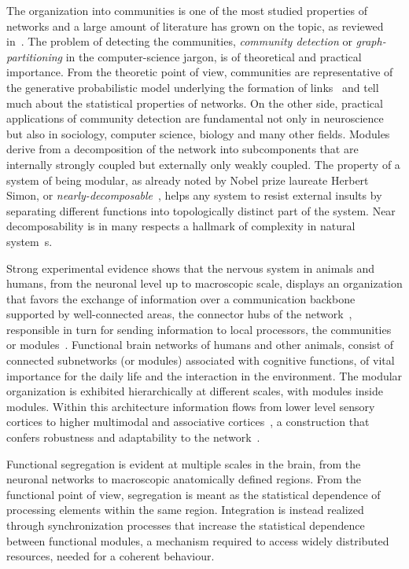 The organization into communities is one of the most studied properties of networks and a large amount of literature has grown on the topic, as reviewed in~\cite{fortunato2010}.
The problem of detecting the communities, \emph{community detection} or \emph{graph-partitioning} in the computer-science jargon, is of theoretical and practical importance.
From the theoretic point of view, communities are representative of the generative probabilistic model underlying the formation of links~\cite{karrer2011} and tell much about the statistical properties of networks.
On the other side, practical applications of community detection are fundamental not only in neuroscience but also in sociology, computer science, biology and many other fields.
Modules derive from a decomposition of the network into subcomponents that are internally strongly coupled but externally only weakly coupled.
The property of a system of being modular, as already noted by Nobel prize laureate Herbert Simon, or \emph{nearly-decomposable}~\cite{simon1991}, helps any system to resist external insults by separating different functions into topologically distinct part of the system.
Near decomposability is in many respects a hallmark of complexity in natural system~s\cite{simon1991}.

Strong experimental evidence shows that the nervous system in animals and humans, from the neuronal level up to macroscopic scale, displays an organization that favors the exchange of information over a communication backbone supported by well-connected areas, the connector hubs of the network~\cite{dereus2013a}, responsible in turn for sending information to local processors, the communities or modules~\cite{vandenheuvel2013a}.
Functional brain networks of humans and other animals, consist of connected subnetworks (or modules) associated with cognitive functions, of vital importance for the daily life and the interaction in the environment.
The modular organization is exhibited hierarchically at different scales, with modules inside modules. Within this architecture information flows from lower level sensory cortices to higher multimodal and associative cortices~\cite{kandel2013}, a construction that confers robustness and adaptability to the network~\cite{meunier2010}.

Functional segregation is evident at multiple scales in the brain, from the neuronal networks to macroscopic anatomically defined regions.
From the functional point of view, segregation is meant as the statistical dependence of processing elements within the same region. Integration is instead realized through synchronization processes that increase the statistical dependence between functional modules, a mechanism required to access widely distributed resources, needed for a coherent behaviour.




